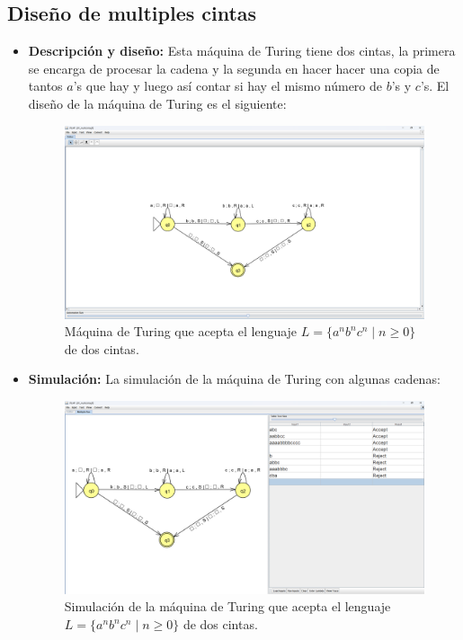 \documentclass[11pt]{report}
\begin{document}
\newpage

\subsection{Diseño de multiples cintas}
\begin{itemize}
  \item \textbf{Descripción y diseño:} Esta máquina de Turing tiene dos cintas, la primera se encarga de procesar la cadena y la segunda en hacer hacer una copia de tantos $a$'s que hay y luego así contar si hay el mismo número de $b$'s y $c$'s. El diseño de la máquina de Turing es el siguiente:

        \begin{figure}[H]
          \centering
          \includegraphics[scale=0.33]{img/MT_01_multiple_ribbon.png}
          \caption{Máquina de Turing que acepta el lenguaje $L = \{a^nb^nc^n \mid n \geq 0\}$ de dos cintas.}
          \label{fig:maquina de turing que acepta el lenguaje L = {a^nb^nc^n | n >= 0}}
        \end{figure}

  \newpage

  \item \textbf{Simulación:} La simulación de la máquina de Turing con algunas cadenas:
        \begin{figure}[H]
          \centering
          \includegraphics[scale=0.33]{img/MT_01_multiple_ribbon_simulation.png}
          \caption{Simulación de la máquina de Turing que acepta el lenguaje $L = \{a^nb^nc^n \mid n \geq 0\}$ de dos cintas.}
          \label{fig:simulacion de la maquina de turing que acepta el lenguaje L = {a^nb^nc^n | n >= 0}}
        \end{figure}
\end{itemize}
\end{document}
